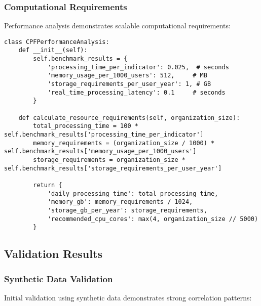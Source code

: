 \documentclass[11pt, onecolumn]{article}
\begin{document}
\subsubsection{Computational Requirements}

Performance analysis demonstrates scalable computational requirements:

\begin{lstlisting}
class CPFPerformanceAnalysis:
    def __init__(self):
        self.benchmark_results = {
            'processing_time_per_indicator': 0.025,  # seconds
            'memory_usage_per_1000_users': 512,     # MB
            'storage_requirements_per_user_year': 1, # GB
            'real_time_processing_latency': 0.1     # seconds
        }
        
    def calculate_resource_requirements(self, organization_size):
        total_processing_time = 100 * self.benchmark_results['processing_time_per_indicator']
        memory_requirements = (organization_size / 1000) * self.benchmark_results['memory_usage_per_1000_users']
        storage_requirements = organization_size * self.benchmark_results['storage_requirements_per_user_year']
        
        return {
            'daily_processing_time': total_processing_time,
            'memory_gb': memory_requirements / 1024,
            'storage_gb_per_year': storage_requirements,
            'recommended_cpu_cores': max(4, organization_size // 5000)
        }
\end{lstlisting}

\subsection{Validation Results}

\subsubsection{Synthetic Data Validation}

Initial validation using synthetic data demonstrates strong correlation patterns:
\end{document}
